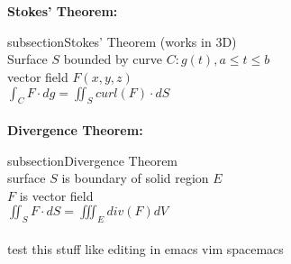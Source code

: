 \documentclass{article}
\newcommand{\zzz}[1]{\0 {\textbf{#1:}} \addcontentsline{toc} {subsection}{#1}}
\begin{document}
\begin{multicols*}{2}
\begin{outline}[compactitem]
\\
\\
\zzz{Stokes' Theorem} (works in 3D)
\\ Surface $S$ bounded by curve $C: g(t), a\leq t \leq b$
\\ vector field $F(x,y,z)$
\\ $\int_C F \cdot dg = \iint_S curl(F)\cdot dS$
\\
\\
\zzz{Divergence Theorem}
\\ surface $S$ is boundary of solid region $E$
\\ $F$ is vector field
\\ $\iint_S F\cdot dS = \iiint_E div(F) dV$
\\
\\
test this stuff like editing in emacs vim spacemacs

\end{outline}
\end{multicols*}
\end{document}
